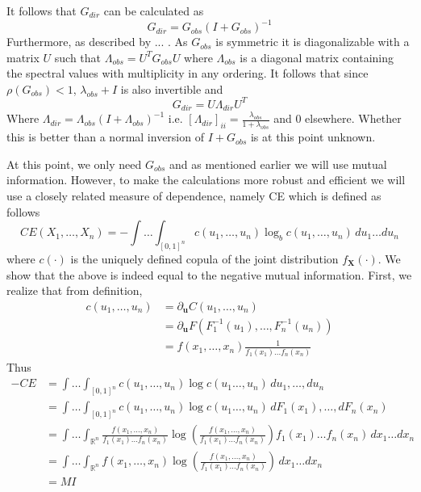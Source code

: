 \documentclass[../Thesis.tex]{subfiles}
\begin{document}
It follows that $G_{dir}$ can be calculated as
$$G_{dir} = G_{obs} \left(I + G_{obs}\right)^{-1}$$
Furthermore, as described by ... . As $G_{obs}$ is symmetric it is diagonalizable with a matrix $U$ such that $\Lambda_{obs} = U^T G_{obs} U$ where $\Lambda_{obs}$ is a diagonal matrix containing the spectral values with multiplicity in any ordering. It follows that since $\rho\left(G_{obs}\right) < 1$, $\lambda_{obs} + I$ is also invertible and
$$G_{dir} = U \Lambda_{dir} U^T$$
Where $\Lambda_{dir} = \Lambda_{obs} \left(I + \Lambda_{obs}\right)^{-1}$ i.e. $\left[\Lambda_{dir}\right]_{ii} = \frac{\lambda_{obs}}{1 + \lambda_{obs}}$ and $0$ elsewhere. Whether this is better than a normal inversion of $I + G_{obs}$ is at this point unknown.

At this point, we only need $G_{obs}$ and as mentioned earlier we will use mutual information. However, to make the calculations more robust and efficient we will use a closely related measure of dependence, namely CE which is defined as follows
$$ CE\left(X_1,\dots, X_n\right) = -\int \dots \int_{[0,1]^n} c\left(u_1,\dots, u_n\right) \log_{b}c\left(u_1,\dots, u_n\right) \, d u_1 \dots d u_n$$
where $c(\cdot)$ is the uniquely defined copula of the joint distribution $f_{\mathbf{X}}(\cdot)$. We show that the above is indeed equal to the negative mutual information. First, we realize that from definition,
\begin{align*}
    c(u_1,\dots , u_n) & = \partial_{\mathbf{u}} C(u_1,\dots,u_n)                                                        \\
                       & = \partial_{\mathbf{u}} F\left(F_1^{-1}\left(u_1\right), \dots, F_n^{-1}\left(u_n\right)\right) \\
                       & = f\left(x_1,\dots, x_n\right) \frac{1}{f_1(x_1)\dots f_n(x_n)}
\end{align*}
Thus
\begin{align*}
    -CE & = \int\dots \int_{[0,1]^n} c\left(u_1,\dots, u_n\right) \log c\left(u_1\dots,u_n\right) \, d u_1, \dots, d u_n                                                                               \\
        & =\int\dots \int_{[0,1]^n} c\left(u_1,\dots, u_n\right) \log c\left(u_1\dots,u_n\right) \, d F_1(x_1), \dots, d F_n(x_n)                                                                      \\
        & = \int \dots \int_{\mathbb{R}^n} \frac{f(x_1,\dots, x_n)}{f_1(x_1)\dots f_n(x_n)} \log\left(\frac{f(x_1,\dots, x_n)}{f_1(x_1)\dots f_n(x_n)}\right) f_1(x_1)\dots f_n(x_n) \, dx_1\dots dx_n \\
        & = \int \dots \int_{\mathbb{R}^n} f(x_1,\dots, x_n) \log\left(\frac{f(x_1,\dots, x_n)}{f_1(x_1)\dots f_n(x_n)}\right)  \, dx_1\dots dx_n                                                      \\
        & = MI
\end{align*}
\end{document}
